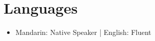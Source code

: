 \section{Languages}
  \begin{itemize}[leftmargin=*]
    \item\small{Mandarin: Native Speaker | English: Fluent}
  \end{itemize}